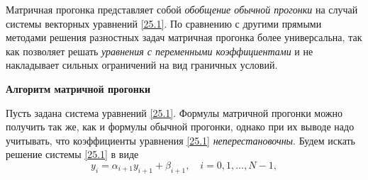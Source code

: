 Матричная прогонка представляет собой \textit{обобщение обычной прогонки} на случай системы векторных уравнений \eqref{25.1}.
 По сравнению с другими прямыми методами решения разностных задач матричная прогонка более универсальна, так как позволяет решать \textit{уравнения с переменными коэффициентами} и не накладывает сильных ограничений на вид граничных условий. 

\textbf{Алгоритм матричной прогонки}

Пусть задана система уравнений \eqref{25.1}. Формулы матричной прогонки можно получить так же, как и формулы обычной прогонки, однако при их выводе надо учитывать, что коэффициенты уравнения \eqref{25.1} \textit{неперестановочны}. Будем искать решение системы \eqref{25.1} в виде 
\begin{equation}\label{25.6}
    y_i = \alpha_{i+1} y_{i+1} + \beta_{i+1}, \quad i = 0, 1, \ldots, N-1,
\end{equation}

